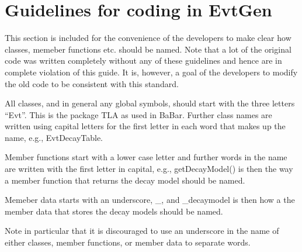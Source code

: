 \section{Guidelines for coding in EvtGen}
\label{sect:codestd}

This section is included for the convenience of the
developers to make clear how classes, memeber functions
etc. should be named. Note that a lot of the original code 
was written completely without any of these guidelines
and hence are in complete violation of this guide. It is,
however, a goal of the developers to modify the old code 
to be consistent with this standard.

All classes, and in general any global symbols, should
start with the three letters ``Evt''. This is the package TLA
as used in BaBar. Further class names are written using
capital letters for the first letter in each word that makes
up the name, e.g., EvtDecayTable.

Member functions start with a lower case letter and further words
in the name are written with the first letter in capital, e.g., 
getDecayModel() is then the way a member function that 
returns the decay model should be named.

Memeber data starts with an underscore, \_, and \_decaymodel
is then how a the member data that stores the decay models 
should be named. 

Note in particular that it is discouraged to use an underscore
in the name of either classes, member functions, or member data
to separate words.
